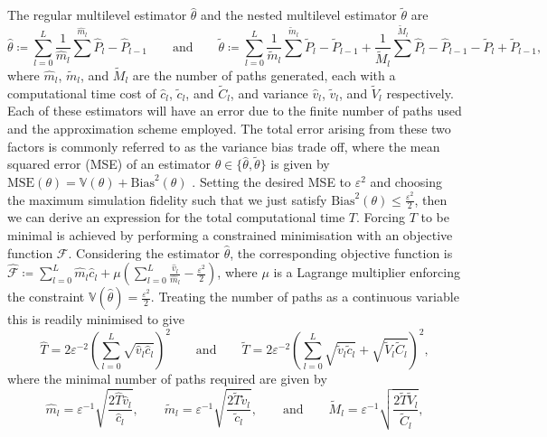 \documentclass[manuscript,review]{acmart}
\begin{document}
The regular multilevel estimator $ \hat{\theta} $ and the nested multilevel estimator $ \tilde{\theta} $ are
\begin{equation*}
\hat{\theta}  \coloneqq \sum_{l=0}^{L} \dfrac{1}{\widehat{m}_l} \sum^{\widehat{m}_l} \widehat{P}_l - \widehat{P}_{l-1}
\qquad \text{and} \qquad
\tilde{\theta} \coloneqq \sum_{l=0}^L \dfrac{1}{\widetilde{m}_l} \sum^{\widetilde{m}_l} \widetilde{P}_l - \widetilde{P}_{l-1} + \dfrac{1}{\widetilde{M}_l} \sum^{\widetilde{M}_l} \widehat{P}_l - \widehat{P}_{l-1} - \widetilde{P}_l + \widetilde{P}_{l-1},
\end{equation*}
where $ \widehat{m}_l $, $ \widetilde{m}_l $, and $ \widetilde{M}_l $ are the number of paths generated, each with a computational time cost of $ \hat{c}_l $, $ \tilde{c}_l $, and $ \widetilde{C}_l $, and variance $ \hat{v}_l $, $ \tilde{v}_l $, and $ \widetilde{V}_l $ respectively. Each of these estimators will have an error due to the finite number of paths used and the approximation scheme employed. The total error arising from these two factors is commonly referred to as the variance bias trade off, where the mean squared error (MSE) of an estimator $ \theta \in \{\hat{\theta}, \tilde{\theta}\} $ is given by $ \text{MSE}(\theta) = \mathbb{V}(\theta) + \text{Bias}^2(\theta)$ \citep[page~16]{glasserman2013monte}. Setting the desired MSE to $ \varepsilon^2 $ and choosing the maximum simulation fidelity such that we just satisfy $ \text{Bias}^2(\theta) \leq \tfrac{\varepsilon^2}{2} $, then we can derive an expression for the total computational time $ T $. Forcing $ T $ to be minimal is achieved by performing a constrained minimisation with an objective function $ \mathscr{F} $. Considering the estimator $ \hat{\theta} $, the corresponding objective function is $ \widehat{\mathscr{F}} \coloneqq \sum_{l=0}^{L} \widehat{m}_l \hat{c}_l + \mu (\sum_{l=0}^{L} \tfrac{\hat{v}_l}{\widehat{m}_l} - \tfrac{\varepsilon^2}{2}) $, where $ \mu $ is a Lagrange multiplier enforcing the constraint $ \mathbb{V}(\hat{\theta}) = \tfrac{\varepsilon^2}{2} $. Treating the number of paths as a continuous variable this is readily minimised to give
\begin{equation*}
\widehat{T} = 2\varepsilon^{-2}\left(\sum_{l=0}^L \sqrt{\hat{v}_l \hat{c}_l}\right)^2 
\qquad \text{and} \qquad 
\widetilde{T} = 2\varepsilon^{-2} \left(\sum_{l=0}^L \sqrt{\tilde{v}_l \tilde{c}_l} + \sqrt{\widetilde{V}_l \widetilde{C}_l}\right)^2,
\end{equation*}
where the minimal number of paths required are given by
\begin{equation*}
\widehat{m}_l = \varepsilon^{-1} \sqrt{\dfrac{2\widehat{T}\hat{v}_l}{\hat{c}_l}},
\qquad 
\widetilde{m}_l  = \varepsilon^{-1} \sqrt{\dfrac{2\widetilde{T} \tilde{v}_l}{\tilde{c}_l}}, 
\qquad 
\text{and}
\qquad 
\widetilde{M}_l  = \varepsilon^{-1} \sqrt{\dfrac{2\widetilde{T} \widetilde{V}_l}{\widetilde{C}_l}},
\end{equation*}
\end{document}
